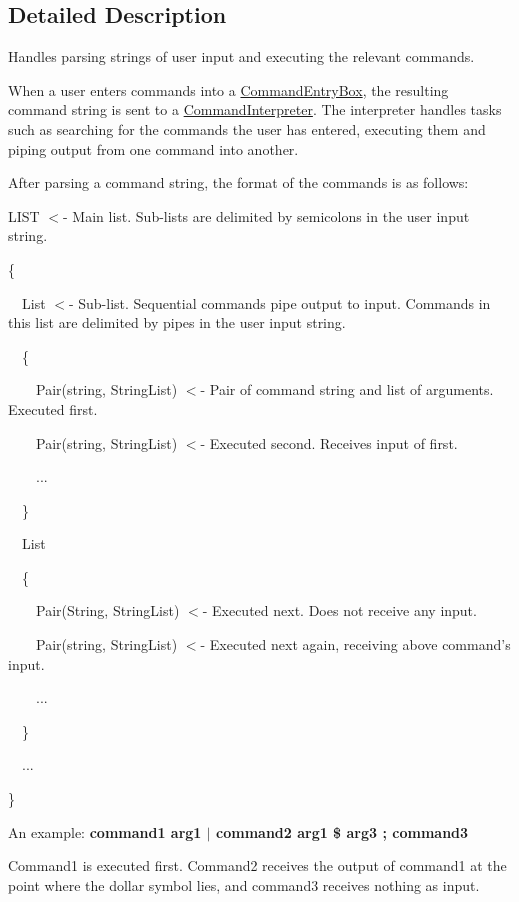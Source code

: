 \subsection{Detailed Description}
Handles parsing strings of user input and executing the relevant commands. 

When a user enters commands into a \hyperlink{class_command_entry_box}{Command\-Entry\-Box}, the resulting command string is sent to a \hyperlink{class_command_interpreter}{Command\-Interpreter}. The interpreter handles tasks such as searching for the commands the user has entered, executing them and piping output from one command into another.

After parsing a command string, the format of the commands is as follows\-:

{\ttfamily L\-I\-S\-T $<$-\/ Main list. Sub-\/lists are delimited by semicolons in the user input string.\par
 \{\par
 ~~List $<$-\/ Sub-\/list. Sequential commands pipe output to input. Commands in this list are delimited by pipes in the user input string.\par
 ~~\{\par
 ~~~~Pair(string, String\-List) $<$-\/ Pair of command string and list of arguments. Executed first.\par
 ~~~~Pair(string, String\-List) $<$-\/ Executed second. Receives input of first.\par
 ~~~~...\par
 ~~\}\par
 \par
 ~~List\par
 ~~\{\par
 ~~~~Pair(\-String, String\-List) $<$-\/ Executed next. Does not receive any input.\par
 ~~~~Pair(string, String\-List) $<$-\/ Executed next again, receiving above command's input.\par
 ~~~~...\par
 ~~\}\par
 \par
 ~~...\par
 \}}\par


An example\-: {\bfseries command1 arg1 $|$ command2 arg1 \$ arg3 ; command3}

Command1 is executed first. Command2 receives the output of command1 at the point where the dollar symbol lies, and command3 receives nothing as input.

